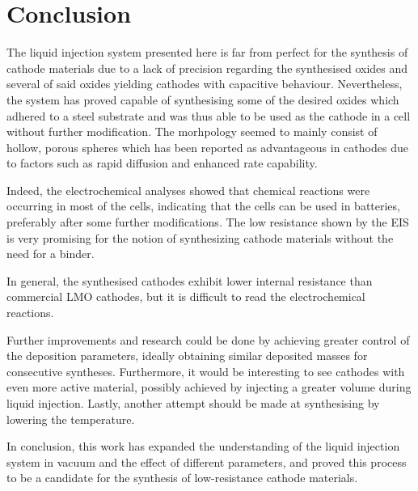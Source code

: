 \documentclass[Main/main.tex]{subfiles}
\begin{document}
\chapter{Conclusion}

The liquid injection system presented here is far from perfect for the synthesis of cathode materials due to a lack of precision regarding the synthesised oxides and several of said oxides yielding cathodes with capacitive behaviour. Nevertheless, the system has proved capable of synthesising some of the desired oxides which adhered to a steel substrate and was thus able to be used as the cathode in a cell without further modification. The morhpology seemed to mainly consist of hollow, porous spheres which has been reported as advantageous in cathodes due to factors such as rapid diffusion and enhanced rate capability.

Indeed, the electrochemical analyses showed that chemical reactions were occurring in most of the cells, indicating that the cells can be used in batteries, preferably after some further modifications. The low resistance shown by the EIS is very promising for the notion of synthesizing cathode materials without the need for a binder.

In general, the synthesised cathodes exhibit lower internal resistance than commercial LMO cathodes, but it is difficult to read the electrochemical reactions.

Further improvements and research could be done by achieving greater control of the deposition parameters, ideally obtaining similar deposited masses for consecutive syntheses. Furthermore, it would be interesting to see cathodes with even more active material, possibly achieved by injecting a greater volume during liquid injection. Lastly, another attempt should be made at synthesising  by lowering the temperature.

In conclusion, this work has expanded the understanding of the liquid injection system in vacuum and the effect of different parameters, and proved this process to be a candidate for the synthesis of low-resistance cathode materials. 
\end{document}
